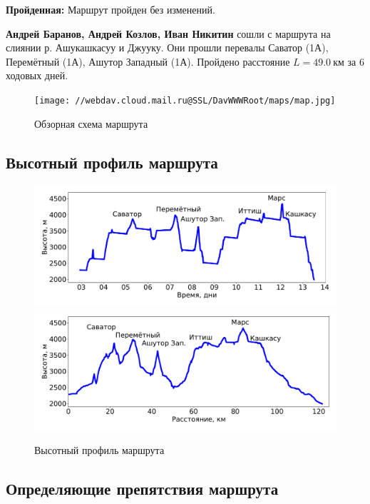 \textbf{Пройденная:} Маршрут пройден без изменений.

\textbf{Андрей Баранов, Андрей Козлов, Иван Никитин} сошли с маршрута на слиянии р. Ашукашкасуу и Джууку. Они прошли перевалы Саватор (1А), Перемётный (1А), Ашутор Западный (1А). Пройдено расстояние $L=49.0~\text{км}$ за 6 ходовых дней.

\begin{figure}[h!tbp]
	\centering
	\texttt{[image: //webdav.cloud.mail.ru@SSL/DavWWWRoot/maps/map.jpg]}
	\caption{Обзорная схема маршрута}
\end{figure}

\newpage
\subsection{Высотный профиль маршрута}

\begin{figure}[h!]
	\centering
	\includegraphics[width=0.92\linewidth]{elevation_vs_time}
	\includegraphics[width=0.92\linewidth]{elevation_vs_distance}
	\caption{Высотный профиль маршрута}
	\label{fig:heights}
\end{figure}

\newpage
\subsection{Определяющие препятствия маршрута}

